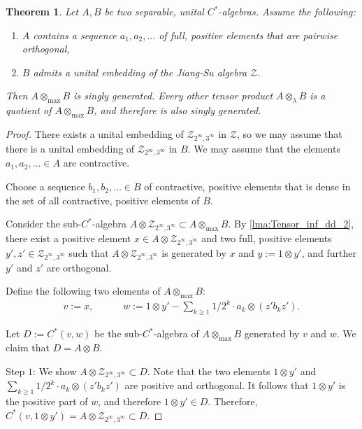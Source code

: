 \documentclass{amsart}
\newtheorem{thm}[thmCt]{Theorem}
\theoremstyle{definition}
\begin{document}
\begin{thm}
\label{thm:Tensor_gen2}
    Let $A, B$ be two separable, unital {{$C^*$-al\-ge\-bra}}{s}.
    Assume the following:
    \begin{enumerate}
        \item
        $A$ contains a sequence $a_1,a_2,\ldots$ of full, positive elements that are pairwise orthogonal,
        \item
        $B$ admits a unital embedding of the Jiang-Su algebra $\mathcal{Z}$.
    \end{enumerate}
    Then $A\otimes_{\text{max}} B$ is singly generated.
    Every other tensor product $A\otimes_\lambda B$ is a quotient of $A\otimes_{\text{max}} B$, and therefore is also singly generated.
\end{thm}
\begin{proof}
    There exists a unital embedding of $\mathcal{Z}_{2^\infty,3^\infty}$ in $\mathcal{Z}$, so we may assume that there is a unital embedding of $\mathcal{Z}_{2^\infty,3^\infty}$ in $B$.
    We may assume that the elements $a_1,a_2,\ldots\in A$ are contractive.

    Choose a sequence $b_1,b_2,\ldots\in B$ of contractive, positive elements that is dense in the set of all contractive, positive elements of $B$.

    Consider the sub-{{$C^*$-al\-ge\-bra}}{} $A\otimes \mathcal{Z}_{2^\infty,3^\infty}\subset A\otimes_{\text{max}} B$.
    By \autoref{lma:Tensor_inf_dd_2}, there exist a positive element $x\in A\otimes \mathcal{Z}_{2^\infty,3^\infty}$ and two full, positive elements $y',z'\in \mathcal{Z}_{2^\infty,3^\infty}$ such that $A\otimes \mathcal{Z}_{2^\infty,3^\infty}$ is generated by $x$ and $y:=1\otimes y'$, and further $y'$ and $z'$ are orthogonal.

    Define the following two elements of $A\otimes_{\text{max}} B$:
    \begin{align*}
        v := x, \quad\quad\quad w:= 1\otimes y' - \sum_{k\geq 1} 1/2^k\cdot a_k\otimes (z'b_kz').
    \end{align*}

    Let $D:=C^*(v,w)$ be the sub-{{$C^*$-al\-ge\-bra}}{} of $A\otimes_{\text{max}} B$ generated by $v$ and $w$.
    We claim that $D=A\otimes B$.

    Step $1$: We show $A\otimes \mathcal{Z}_{2^\infty,3^\infty}\subset D$.
    Note that the two elements $1\otimes y'$ and $\sum_{k\geq 1} 1/2^k\cdot a_k\otimes (z'b_kz')$ are positive and orthogonal.
    It follows that $1\otimes y'$ is the positive part of $w$, and therefore $1\otimes y'\in D$.
    Therefore, $C^*(v,1\otimes y')=A\otimes \mathcal{Z}_{2^\infty,3^\infty}\subset D$.


\end{proof}
\end{document}
